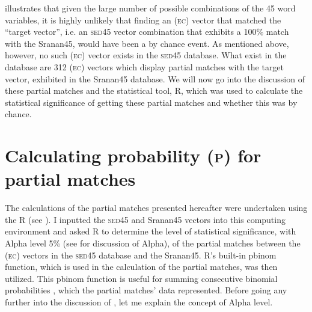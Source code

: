  illustrates that given the large number of possible combinations of the 45 word variables, it is highly unlikely that finding an (\textsc{ec}) vector that matched the ``target vector'', i.e. an \textsc{sed45} vector combination that exhibits a 100\% match with the Sranan45, would have been a by chance event. As mentioned above, however, no such (\textsc{ec}) vector exists in the  \textsc{sed45} database. What exist in the database are 312 (\textsc{ec}) vectors which display partial matches with the target vector, exhibited in the Sranan45 database. We will now go into the discussion of these partial matches and the statistical tool, R, which was used to calculate the statistical significance of getting these partial matches and whether this was by chance.

\section{Calculating probability (\textsc{p}) for partial matches}\label{4.2}
The  calculations of the partial matches presented hereafter were undertaken using the  R (see ). I inputted the \textsc{sed45} and Sranan45 vectors into this computing environment and asked R to determine the level of statistical significance, with Alpha level 5\% (see  for discussion of Alpha), of the partial matches between the (\textsc{ec}) vectors in the \textsc{sed45} database and the Sranan45. R's built-in pbinom function, which is used in the calculation of the partial matches, was then utilized. This pbinom function is useful for summing consecutive binomial probabilities \citep{Stats}, which the partial matches' data represented. Before going any further into the discussion of , let me explain the concept of
Alpha level.


